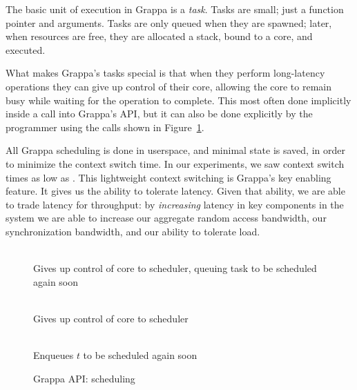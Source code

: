 The basic unit of execution in Grappa is a {\em task}. Tasks are
small; just a function pointer and arguments. Tasks are only
queued when they are spawned; later, when resources are free, they are
allocated a stack, bound to a core, and executed.

What makes Grappa's tasks special is that when they perform
long-latency operations they can give up control of their core,
allowing the core to remain busy while waiting for the operation to
complete. This most often done implicitly inside a call into Grappa's
API, but it can also be done explicitly by the programmer using the
calls shown in Figure~\ref{fig:scheduling}. 

All Grappa scheduling is done in userspace, and minimal state is
saved, in order to minimize the context switch time. In our
experiments, we saw context switch times as low as .
This lightweight context switching is Grappa's key enabling
feature. It gives us the ability to tolerate latency. Given that
ability, we are able to trade latency for throughput: by {\em
  increasing} latency in key components in the system we are able to
increase our aggregate random access bandwidth, our synchronization
bandwidth, and our ability to tolerate load.

\begin{figure}[htbp]
  \begin{center}
    \begin{description}\small
    \item[ \texttt{ yield() } ] \hfill \\
      Gives up control of core to scheduler, queuing task to be scheduled again soon
    \item[ \texttt{ suspend() } ] \hfill \\
      Gives up control of core to scheduler
    \item[ \texttt{ wake( task * $t$ ) } ] \hfill \\
      Enqueues $t$ to be scheduled again soon
    \end{description}
    \begin{minipage}{0.95\columnwidth}
      \caption{\label{fig:scheduling} Grappa API: scheduling} %
    \end{minipage}
  \end{center}
\end{figure}


